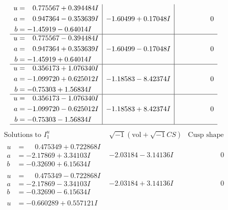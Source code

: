 \documentclass[1p]{elsarticle_modified}
\theoremstyle{definition}
\newcommand{\I}{\sqrt{-1}}
\begin{document}
$$\begin{array}{c|c|c}
\begin{aligned}
u &= \phantom{-}0.775567 + 0.394484 I \\
a &= \phantom{-}0.947364 - 0.353639 I \\
b &= -1.45919 - 0.64014 I\end{aligned}
 & -1.60499 + 0.17048 I & \phantom{-0.000000 } 0 \\ \hline\begin{aligned}
u &= \phantom{-}0.775567 - 0.394484 I \\
a &= \phantom{-}0.947364 + 0.353639 I \\
b &= -1.45919 + 0.64014 I\end{aligned}
 & -1.60499 - 0.17048 I & \phantom{-0.000000 } 0 \\ \hline\begin{aligned}
u &= \phantom{-}0.356173 + 1.076340 I \\
a &= -1.099720 + 0.625012 I \\
b &= -0.75303 + 1.56834 I\end{aligned}
 & -1.18583 - 8.42374 I & \phantom{-0.000000 } 0 \\ \hline\begin{aligned}
u &= \phantom{-}0.356173 - 1.076340 I \\
a &= -1.099720 - 0.625012 I \\
b &= -0.75303 - 1.56834 I\end{aligned}
 & -1.18583 + 8.42374 I & \phantom{-0.000000 } 0\\
 \hline 
 \end{array}$$\newpage$$\begin{array}{c|c|c}  
\text{Solutions to }I^u_{1}& \I (\text{vol} + \sqrt{-1}CS) & \text{Cusp shape}\\
 \hline 
\begin{aligned}
u &= \phantom{-}0.475349 + 0.722868 I \\
a &= -2.17869 + 3.34103 I \\
b &= -0.32690 + 6.15634 I\end{aligned}
 & -2.03184 - 3.14136 I & \phantom{-0.000000 } 0 \\ \hline\begin{aligned}
u &= \phantom{-}0.475349 - 0.722868 I \\
a &= -2.17869 - 3.34103 I \\
b &= -0.32690 - 6.15634 I\end{aligned}
 & -2.03184 + 3.14136 I & \phantom{-0.000000 } 0 \\ \hline\begin{aligned}
u &= -0.660289 + 0.557121 I \\

\end{aligned}
\end{array}$$
\end{document}
